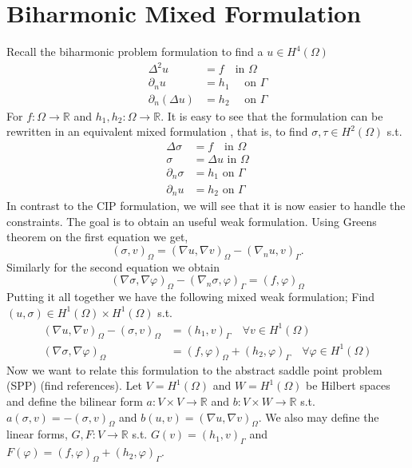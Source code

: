 
\newpage
\section{Biharmonic Mixed Formulation}%
\label{sec:biharmonic_mixed_formulation}

Recall the biharmonic problem formulation to find a $u \in H^4( \Omega ) $  \[
    \begin{split}
\Delta ^2 u & = f \quad  \text{in } \Omega \\
\partial _{n} u & = h_{1} \quad \text{ on } \Gamma  \\
\partial _{n}( \Delta u)  & = h_{2} \quad \text{ on } \Gamma
    \end{split}
\]
For $f: \Omega  \to  \mathbb{R} $ and $h_{1},h_{2}: \Omega  \to \mathbb{R}  $. It is easy to see
that the formulation can be rewritten in an equivalent mixed formulation , that is, to find $\sigma, \tau  \in H^2( \Omega ) $ s.t. \[
    \begin{split}
\Delta \sigma  & = f \quad  \text{in } \Omega \\
\sigma   & = \Delta u  \text{ in } \Omega \\
\partial _{n} \sigma  & = h_{1} \text{ on } \Gamma  \\
\partial _{n} u   & = h_{2} \text{ on } \Gamma
    \end{split}
\]
In contrast to the CIP formulation, we will see that it is now easier to handle the constraints.
The goal is to obtain an useful weak formulation. Using Greens theorem on the first equation we get,
\[
( \sigma, v)_{\Omega } = ( \nabla  u , \nabla v  )_{\Omega } - ( \nabla _{n} u , v) _{\Gamma }.
\]
Similarly for the second equation we obtain
\[
( \nabla \sigma , \nabla \varphi  )_{\Omega} - ( \nabla _{n} \sigma ,  \varphi )_{\Gamma } = ( f,\varphi ) _{\Omega}
\]
Putting it all together we have the following mixed weak formulation; Find $( u, \sigma ) \in H^{1}( \Omega ) \times H^{1}( \Omega )  $ s.t. \[
    \begin{split}
     ( \nabla  u , \nabla v  )_{\Omega } -( \sigma, v)_{\Omega }  & =   ( h_{1} , v) _{\Gamma } \quad  \forall v \in H^{1}( \Omega ) \\
( \nabla \sigma , \nabla \varphi  )_{\Omega}  & = ( f,\varphi ) _{\Omega} + ( h_{2} ,  \varphi )_{\Gamma } \quad  \forall \varphi \in H^{1}( \Omega )
    \end{split}
\]
Now we want to relate this formulation to the abstract saddle point problem (SPP) (find references).
Let $V = H^{1}( \Omega ) $  and $W=H^{1}( \Omega ) $ be  Hilbert spaces and define the bilinear form $a: V\times V \to \mathbb{R}  $ and $b: V \times W \to \mathbb{R} $ s.t. $a( \sigma,v ) = - ( \sigma , v) _{\Omega }  $ and $b( u,v) = ( \nabla u,
\nabla v)_{\Omega  }  $. We also may define the linear forms, $G,F: V \to \mathbb{R} $ s.t. $ G( v)  = ( h_{1}, v) _{\Gamma } $ and $F( \varphi ) = ( f, \varphi )_{\Omega } + ( h_{2}, \varphi )_{\Gamma } $.

